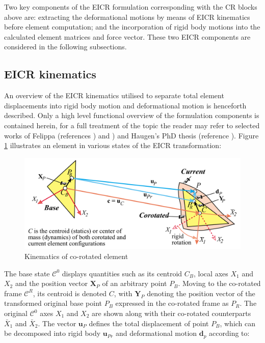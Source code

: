 Two key components of the EICR formulation corresponding with the CR blocks above are: extracting the deformational motions by means of EICR kinematics before element computation; and the incorporation of rigid body motions into the calculated element matrices and force vector. These two EICR components are considered in the following subsections.

\subsection{EICR kinematics}
An overview of the EICR kinematics utilised to separate total element displacements into rigid body motion and deformational motion is henceforth described. Only a high level functional overview of the formulation components is contained herein, for a full treatment of the topic the reader may refer to selected works of Felippa (references \cite{FelippaCR1_2016}) and \cite{felippa2000systematic}) and Haugen's PhD thesis (reference \cite{Hau94}). Figure \ref{cr4} illustrates an element in various states of the EICR transformation:

\begin{figure}[H]
	\centering
	\def\svgwidth{\columnwidth}
	\includegraphics[width=14cm]{images/cr_4.png}
	\caption{Kinematics of co-rotated element \cite{felippa2000systematic}}
	\label{cr4}
\end{figure}

The base state $\mathscr{C}^0$ displays quantities such as its centroid $C_B$, local axes $X_1$ and $X_2$ and the position vector $\mathbf{X}_P$ of an arbitrary point $P_B$. Moving to the co-rotated frame $\mathscr{C}^R$, its centroid is denoted $C$, with $\mathbf{Y}_P$ denoting the position vector of the transformed original base point $P_B$ expressed in the co-rotated frame as $P_R$. The original $\mathscr{C}^0$ axes $X_1$ and $X_2$ are shown along with their co-rotated counterparts $\bar{X}_1$ and $\bar{X}_2$. The vector $\mathbf{u}_P$ defines the total displacement of point $P_B$, which can be decomposed into rigid body $\mathbf{u}_{Pr}$ and deformational motion $\mathbf{d}_p$ according to:

